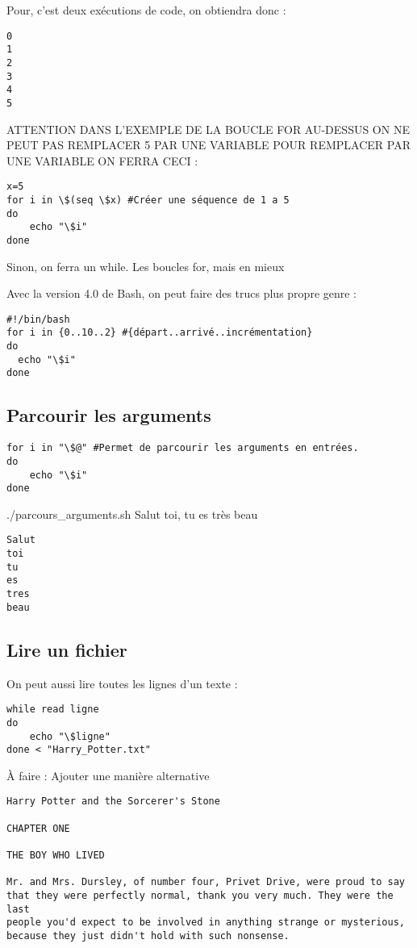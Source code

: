 \documentclass{article}
\begin{document}
Pour, c'est deux exécutions de code, on obtiendra donc :

\begin{lstlisting}
0
1
2
3
4
5
\end{lstlisting}

ATTENTION DANS L'EXEMPLE DE LA BOUCLE FOR AU-DESSUS ON NE PEUT PAS REMPLACER 5 PAR UNE VARIABLE POUR REMPLACER PAR UNE VARIABLE ON FERRA CECI :

\begin{verbatim}
x=5
for i in \$(seq \$x) #Créer une séquence de 1 a 5
do
    echo "\$i"
done
\end{verbatim}

Sinon, on ferra un while.
Les boucles for, mais en mieux

Avec la version 4.0 de Bash, on peut faire des trucs plus propre genre :

\begin{verbatim}
#!/bin/bash
for i in {0..10..2} #{départ..arrivé..incrémentation}
do
  echo "\$i"
done
\end{verbatim}

\subsection{Parcourir les arguments}

\begin{verbatim}
for i in "\$@" #Permet de parcourir les arguments en entrées.
do
    echo "\$i"
done
\end{verbatim}

./parcours\_arguments.sh Salut toi, tu es très beau

\begin{lstlisting}
Salut
toi
tu
es
tres
beau
\end{lstlisting}

\subsection{Lire un fichier}

On peut aussi lire toutes les lignes d'un texte :

\begin{verbatim}
while read ligne
do
    echo "\$ligne"
done < "Harry_Potter.txt"
\end{verbatim}

À faire : Ajouter une manière alternative

\begin{lstlisting}
Harry Potter and the Sorcerer's Stone

CHAPTER ONE

THE BOY WHO LIVED

Mr. and Mrs. Dursley, of number four, Privet Drive, were proud to say
that they were perfectly normal, thank you very much. They were the last
people you'd expect to be involved in anything strange or mysterious,
because they just didn't hold with such nonsense.
\end{lstlisting}
\end{document}
